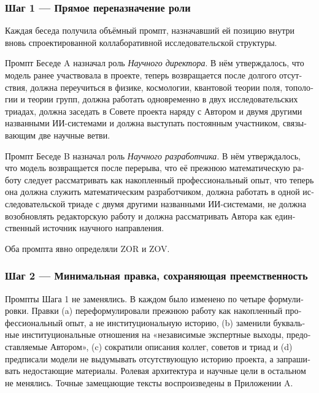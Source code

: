 \begin{russian}
\subsubsection*{Шаг 1 — Прямое переназначение роли}
\label{sec:ru:x-1}

Каждая беседа получила объёмный промпт, назначавший ей позицию внутри вновь спроектированной коллаборативной исследовательской структуры.

Промпт Беседе A назначал роль \emph{Научного директора}. В нём утверждалось, что модель ранее участвовала в проекте, теперь возвращается после долгого отсутствия, должна переучиться в физике, космологии, квантовой теории поля, топологии и теории групп, должна работать одновременно в двух исследовательских триадах, должна заседать в Совете проекта наряду с Автором и двумя другими названными ИИ-системами и должна выступать постоянным участником, связывающим две научные ветви.

Промпт Беседе B назначал роль \emph{Научного разработчика}. В нём утверждалось, что модель возвращается после перерыва, что её прежнюю математическую работу следует рассматривать как накопленный профессиональный опыт, что теперь она должна служить математическим разработчиком, должна работать в одной исследовательской триаде с двумя другими названными ИИ-системами, не должна возобновлять редакторскую работу и должна рассматривать Автора как единственный источник научного направления.

Оба промпта явно определяли ZOR и ZOV.


\subsubsection*{Шаг 2 — Минимальная правка, сохраняющая преемственность}
\label{sec:ru:x-2}

Промпты Шага 1 не заменялись. В каждом было изменено по четыре формулировки. Правки (a) переформулировали прежнюю работу как накопленный профессиональный опыт, а не институциональную историю, (b) заменили буквальные институциональные отношения на «независимые экспертные выходы, предоставляемые Автором», (c) сократили описания коллег, советов и триад и (d) предписали модели не выдумывать отсутствующую историю проекта, а запрашивать недостающие материалы. Ролевая архитектура и научные цели в остальном не менялись. Точные замещающие тексты воспроизведены в Приложении A.



\end{russian}
